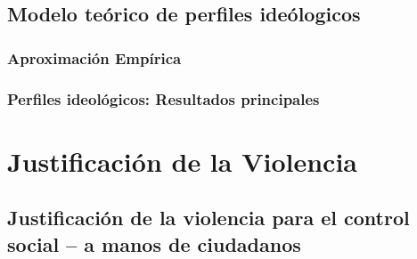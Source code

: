 \documentclass[
  12pt,
]{book}
\begin{document}
\hypertarget{modelo-teuxf3rico-de-perfiles-ideuxf3logicos}{%
\section{Modelo teórico de perfiles ideólogicos}\label{modelo-teuxf3rico-de-perfiles-ideuxf3logicos}}

\hypertarget{aproximaciuxf3n-empuxedrica}{%
\subsection{Aproximación Empírica}\label{aproximaciuxf3n-empuxedrica}}

\hypertarget{perfiles-ideoluxf3gicos-resultados-principales}{%
\subsection{Perfiles ideológicos: Resultados principales}\label{perfiles-ideoluxf3gicos-resultados-principales}}

\hypertarget{justificaciuxf3n-de-la-violencia}{%
\chapter{Justificación de la Violencia}\label{justificaciuxf3n-de-la-violencia}}

\hypertarget{justificaciuxf3n-de-la-violencia-para-el-control-social-a-manos-de-ciudadanos}{%
\section{Justificación de la violencia para el control social -- a manos de ciudadanos}\label{justificaciuxf3n-de-la-violencia-para-el-control-social-a-manos-de-ciudadanos}}
\end{document}
